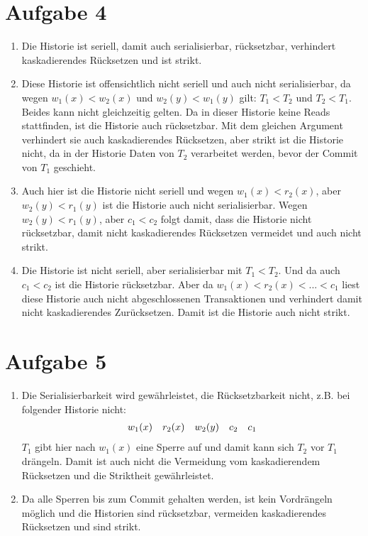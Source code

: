 \documentclass{article}
\begin{document}
	\section*{Aufgabe 4}
	\begin{enumerate}[label=(\alph*)]
		\item Die Historie ist seriell, damit auch serialisierbar, rücksetzbar, verhindert kaskadierendes Rücksetzen und ist strikt.
		\item Diese Historie ist offensichtlich nicht seriell und auch nicht serialisierbar, da wegen $w_1(x) < w_2(x)$ und $w_2(y) < w_1(y)$ gilt: $T_1 < T_2$ und $T_2 < T_1$. Beides kann nicht gleichzeitig gelten. Da in dieser Historie keine Reads stattfinden, ist die Historie auch rücksetzbar. Mit dem gleichen Argument verhindert sie auch kaskadierendes Rücksetzen, aber strikt ist die Historie nicht, da in der Historie Daten von $T_2$ verarbeitet werden, bevor der Commit von $T_1$ geschieht.
		\item Auch hier ist die Historie nicht seriell und wegen $w_1(x) < r_2(x)$, aber $w_2(y) < r_1(y)$ ist die Historie auch nicht serialisierbar. Wegen $w_2(y) < r_1(y)$, aber $c_1 < c_2$ folgt damit, dass die Historie nicht rücksetzbar, damit nicht kaskadierendes Rücksetzen vermeidet und auch nicht strikt.
		\item Die Historie ist nicht seriell, aber serialisierbar mit $T_1 < T_2$. Und da auch $c_1 < c_2$ ist die Historie rücksetzbar. Aber da $w_1(x) < r_2(x) < ... < c_1$ liest diese Historie auch nicht abgeschlossenen Transaktionen und verhindert damit nicht kaskadierendes Zurücksetzen. Damit ist die Historie auch nicht strikt.
	\end{enumerate}

	\section*{Aufgabe 5}
	\begin{enumerate}[label=(\alph*)]
		\item Die Serialisierbarkeit wird gewährleistet, die Rücksetzbarkeit nicht, z.B. bei folgender Historie nicht:
		\begin{align}
			w_1(x) \quad r_2(x) \quad w_2(y) \quad c_2\quad c_1 \notag
		\end{align}
		$T_1$ gibt hier nach $w_1(x)$ eine Sperre auf und damit kann sich $T_2$ vor $T_1$ drängeln. Damit ist auch nicht die Vermeidung vom kaskadierendem Rücksetzen und die Striktheit gewährleistet.
		\item Da alle Sperren bis zum Commit gehalten werden, ist kein Vordrängeln möglich und die Historien sind rücksetzbar, vermeiden kaskadierendes Rücksetzen und sind strikt.
	\end{enumerate}
\end{document}
